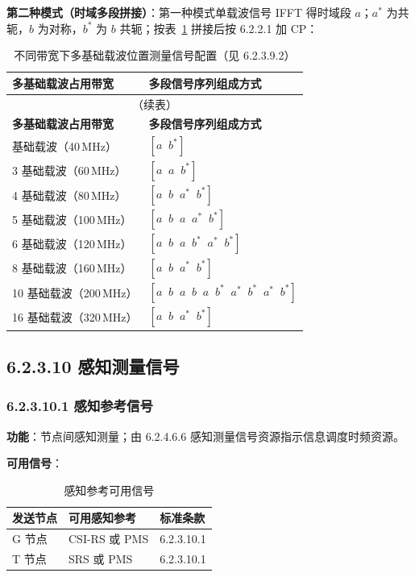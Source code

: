 \documentclass[11pt,a4paper]{ctexart}
\begin{document}
\textbf{第二种模式（时域多段拼接）}：第一种模式单载波信号 IFFT 得时域段 $a$；$a^*$ 为共轭，$b$ 为对称，$b^*$ 为 $b$ 共轭；按表~\ref{tab:623-pms-concat} 拼接后按 6.2.2.1 加 CP：

\begin{longtable}{ll}
\caption{不同带宽下多基础载波位置测量信号配置（见 6.2.3.9.2）\label{tab:623-pms-concat}} \\
\toprule
\textbf{多基础载波占用带宽} & \textbf{多段信号序列组成方式} \\
\midrule
\endfirsthead
\multicolumn{2}{c}{\small（续表）} \\
\toprule
\textbf{多基础载波占用带宽} & \textbf{多段信号序列组成方式} \\
\midrule
\endhead
\bottomrule
\endfoot
2 基础载波（40\,MHz） & $[a\;\; b^*]$ \\
3 基础载波（60\,MHz） & $[a\;\; a\;\; b^*]$ \\
4 基础载波（80\,MHz） & $[a\;\; b\;\; a^*\;\; b^*]$ \\
5 基础载波（100\,MHz） & $[a\;\; b\;\; a\;\; a^*\;\; b^*]$ \\
6 基础载波（120\,MHz） & $[a\;\; b\;\; a\;\; b^*\;\; a^*\;\; b^*]$ \\
8 基础载波（160\,MHz） & $[a\;\; b\;\; a^*\;\; b^*]$ \\
10 基础载波（200\,MHz） & $[a\;\; b\;\; a\;\; b\;\; a\;\; b^*\;\; a^*\;\; b^*\;\; a^*\;\; b^*]$ \\
16 基础载波（320\,MHz） & $[a\;\; b\;\; a^*\;\; b^*]$ \\
\end{longtable}

\subsection{6.2.3.10 感知测量信号}

\subsubsection{6.2.3.10.1 感知参考信号}

\textbf{功能}：节点间感知测量；由 6.2.4.6.6 感知测量信号资源指示信息调度时频资源。

\textbf{可用信号}：
\begin{longtable}{lll}
\caption{感知参考可用信号} \\
\toprule
\textbf{发送节点} & \textbf{可用感知参考} & \textbf{标准条款} \\
\midrule
G 节点 & CSI-RS 或 PMS & 6.2.3.10.1 \\
T 节点 & SRS 或 PMS & 6.2.3.10.1 \\
\bottomrule
\end{longtable}
\end{document}
